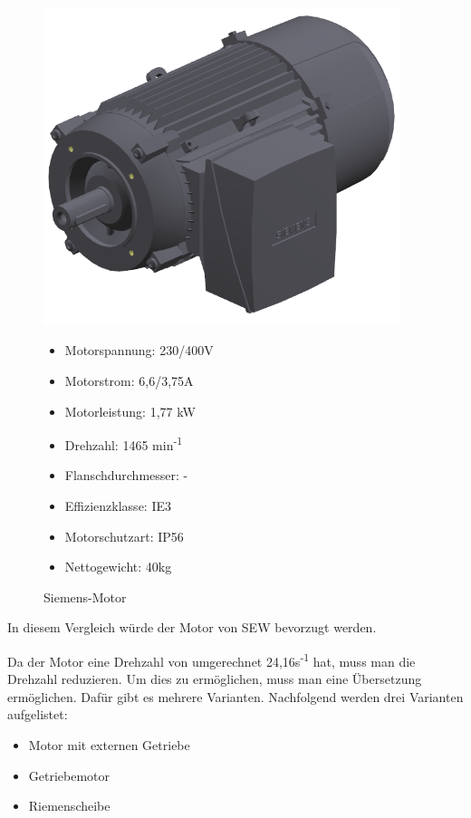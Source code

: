 \begin{figure}[!ht]
\begin{minipage}[t]{0.45\textwidth}
\includegraphics[width=0.93\textwidth]{SiemensMotor}
\caption{Siemens-Motor}

\begin{itemize}
	\item{Motorspannung: 230/400V}
	\item{Motorstrom: 6,6/3,75A}
	\item{Motorleistung: 1,77 kW}
	\item{Drehzahl: 1465 min\textsuperscript{-1}}
	\item{Flanschdurchmesser: -}
	\item{Effizienzklasse: IE3}
	\item{Motorschutzart: IP56}
	\item{Nettogewicht: 40kg}
\end{itemize}

\end{minipage}
\end{figure}

In diesem Vergleich würde der Motor von SEW bevorzugt werden.

Da der Motor eine Drehzahl von umgerechnet 24,16s\textsuperscript{-1} hat, muss man die Drehzahl reduzieren. Um dies zu ermöglichen, muss man eine Übersetzung ermöglichen. Dafür gibt es mehrere Varianten. Nachfolgend werden drei Varianten aufgelistet:

\begin{itemize}
	\item{Motor mit externen Getriebe}
	\item{Getriebemotor}
	\item{Riemenscheibe}
\end{itemize}

